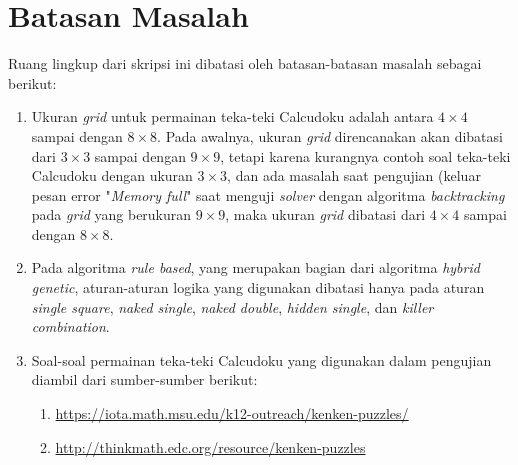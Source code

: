 \section{Batasan Masalah}
\label{sec:batasan}
Ruang lingkup dari skripsi ini dibatasi oleh batasan-batasan masalah sebagai berikut:
\begin{enumerate}
\item Ukuran \textit{grid} untuk permainan teka-teki Calcudoku adalah antara \begin{math}4 \times 4\end{math} sampai dengan \begin{math}8 \times 8\end{math}. Pada awalnya, ukuran \textit{grid} direncanakan akan dibatasi dari \begin{math}3 \times 3\end{math} sampai dengan \begin{math}9 \times 9\end{math}, tetapi karena kurangnya contoh soal teka-teki Calcudoku dengan ukuran \begin{math}3 \times 3\end{math}, dan ada masalah saat pengujian (keluar pesan error "\textit{Memory full}" saat menguji \textit{solver} dengan algoritma \textit{backtracking} pada \textit{grid} yang berukuran \begin{math}9 \times 9\end{math}, maka ukuran \textit{grid} dibatasi dari \begin{math}4 \times 4\end{math} sampai dengan \begin{math}8 \times 8\end{math}.
\item Pada algoritma \textit{rule based}, yang merupakan bagian dari algoritma \textit{hybrid genetic}, aturan-aturan logika yang digunakan dibatasi hanya pada aturan \textit{single square}, \textit{naked single}, \textit{naked double}, \textit{hidden single}, dan \textit{killer combination}.
\item Soal-soal permainan teka-teki Calcudoku yang digunakan dalam pengujian diambil dari sumber-sumber berikut:
	\begin{enumerate}
	\item \url{https://iota.math.msu.edu/k12-outreach/kenken-puzzles/}
	\item \url{http://thinkmath.edc.org/resource/kenken-puzzles}
	\end{enumerate}
\end{enumerate}

